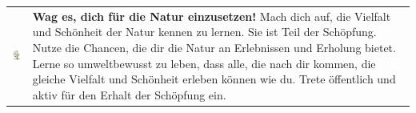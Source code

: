\begin{tabular}{m{2cm}m{10cm}}
	\includegraphics[width=2cm]{Ausgaben/Sola24/Grafiken/natur.png} & \textbf{Wag es, dich für die Natur einzusetzen!} \newline
	Mach dich auf, die Vielfalt und Schönheit der Natur kennen zu lernen. Sie ist Teil der Schöpfung. Nutze die Chancen, die dir die Natur an Erlebnissen und Erholung bietet. Lerne so umweltbewusst zu leben, dass alle, die nach dir kommen, die gleiche Vielfalt und Schönheit erleben können wie du. Trete öffentlich und aktiv für den Erhalt der Schöpfung ein. \\
	\end{tabular}
	\newpage